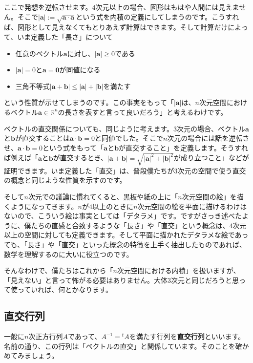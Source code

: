 ここで発想を逆転させます。$4$次元以上の場合、図形はもはや人間には見えません。そこで$|\bm{a}| := \sqrt{\bm{a} \cdot \bm{a}}$という式を内積の定義にしてしまうのです。こうすれば、図形として見えなくてもとりあえず計算はできます。そして計算だけによって、いま定義した「長さ」について
\begin{itemize}
\item 任意のベクトル$\bm{a}$に対し、$|\bm{a}| \geq 0$である
\item $|\bm{a}| = 0$と$\bm{a} = \bm{0}$が同値になる
\item 三角不等式$|\bm{a} + \bm{b}| \leq |\bm{a}| + |\bm{b}|$を満たす
\end{itemize}
という性質が示せてしまうのです。この事実をもって「$|\bm{a}|$は、$n$次元空間におけるベクトル$\bm{a} \in \mathbb{R}^n$の長さを表すと言って良いだろう」と考えるわけです。

ベクトルの直交関係についても、同じように考えます。$3$次元の場合、ベクトル$\bm{a}$と$\bm{b}$が直交することは$\bm{a} \cdot \bm{b} = 0$と同値でした。そこで$n$次元の場合には話を逆転させ、$\bm{a} \cdot \bm{b} = 0$という式をもって「$\bm{a}$と$\bm{b}$が直交すること」を定義します。そうすれば例えば「$\bm{a}$と$\bm{b}$が直交するとき、$|\bm{a} + \bm{b}| = \sqrt{|\bm{a}|^2 + |\bm{b}|^2}$が成り立つこと」などが証明できます。いま定義した「直交」は、普段僕たちが$3$次元の空間で使う直交の概念と同じような性質を示すのです。

そして$n$次元での議論に慣れてくると、黒板や紙の上に「$n$次元空間の絵」を描くようになってきます。$n$が$4$以上のときに$n$次元空間の絵を平面に描けるわけはないので、こういう絵は事実としては「デタラメ」です。ですがさっき述べたように、僕たちの直感と合致するような「長さ」や「直交」という概念は、$4$次元以上の空間に対しても定義できます。そして平面に描かれたデタラメな絵であっても、「長さ」や「直交」といった概念の特徴を上手く抽出したものであれば、数学を理解するのに大いに役立つのです。

そんなわけで、僕たちはこれから「$n$次元空間における内積」を扱いますが、「見えない」と言って怖がる必要はありません。大体$3$次元と同じだろうと思って使っていれば、何とかなります。

\subsection{直交行列}

一般に$n$次正方行列$A$であって、$A^{-1} = {}^t\!A$を満たす行列を\textbf{直交行列}といいます。名前の通り、この行列は「ベクトルの直交」と関係しています。そのことを確かめてみましょう。


